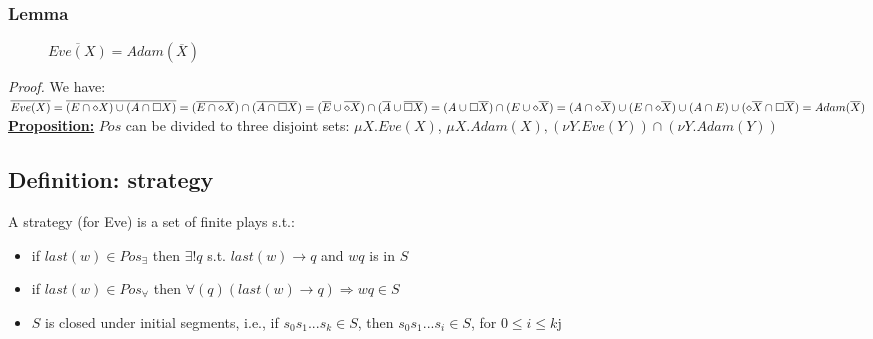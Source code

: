 \subsubsection*{Lemma}
\begin{figure}[H]
	\centering
	$\overline{Eve(X)} = Adam(\overline{X})$
\end{figure}
\textit{Proof.} We have:\\
$\overline{Eve(X)} = \overline{(E \cap \diamond X) \cup (A \cap \square X)}\newline
 = (\overline{E \cap \diamond X}) \cap (\overline{A \cap \square X})\newline
 = (\overline{E} \cup \overline{\diamond X}) \cap (\overline{A} \cup \overline{\square X})\newline
 = (A \cup \square \overline{X}) \cap (E \cup \diamond \overline{X})\newline
 = (A \cap \diamond \overline{X}) \cup (E \cap \diamond \overline{X})
 \cup (A \cap E) \cup (\diamond \overline{X} \cap \square \overline{X}) = Adam(\overline{X})$\\

\noindent
\underline{\textbf{Proposition:}} $Pos$ can be divided to three disjoint sets:
$\mu X. Eve(X)$, $\mu X. Adam(X), (\nu Y. Eve(Y)) \cap (\nu Y. Adam(Y))$\\

\subsection*{Definition: strategy}
A strategy (for Eve) is a set of finite plays s.t.:
\begin{itemize}
	\item if $last(w) \in Pos_{\exists}$ then $\exists! q$ s.t. $last(w) \rightarrow q$ and $wq$ is in $S$
	\item if $last(w) \in Pos_{\forall}$ then $\forall(q) (last(w) \rightarrow q) \Rightarrow wq \in S$
	\item $S$ is closed under initial segments, i.e., if $s_0s_1...s_k \in S$, then $s_0s_1...s_i \in S$,
	for $0 \leq i \leq k$j
\end{itemize}
